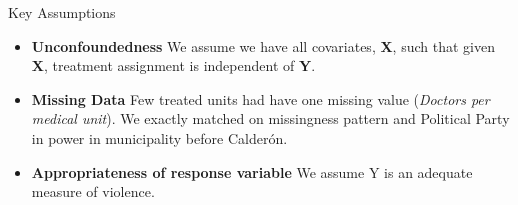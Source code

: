 \documentclass[final]{beamer}
\newlength{\onecolwid}
\begin{document}
\begin{frame}[t]
\begin{columns}[t]
\begin{column}{\onecolwid}
\begin{block}{Key Assumptions}
\begin{itemize}
\begin{itemize}
		\end{itemize}
			\item \textbf{Unconfoundedness} We assume we have all covariates, \textbf{X}, such that given \textbf{X},  treatment assignment is independent of \textbf{Y}.
			\item \textbf{Missing Data} Few treated units had have one missing value (\emph{Doctors per medical unit}). We exactly matched on missingness pattern and Political Party in power in municipality before Calder\'{o}n.
			\item \textbf{Appropriateness of response variable} We assume Y is an adequate measure of violence.	 %
		\end{itemize}
\end{block}

    \end{column}


\end{columns}
\end{frame}
\end{document}
